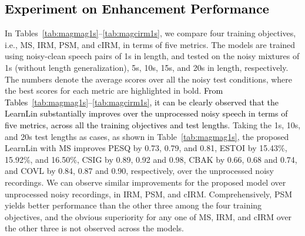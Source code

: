 \documentclass[journal]{IEEEtran}
\begin{document}
\subsection{\textcolor{black}{Experiment on Enhancement Performance}}\label{sec:5.2}


In Tables~\ref{tab:magmag1s}--\ref{tab:magcirm1s}, we compare four training objectives, i.e., MS, IRM, PSM, and cIRM, in terms of five metrics. The models are trained using noisy-clean speech pairs of 1s in length, and tested on the noisy mixtures of 1s (without length generalization), 5s, 10s, 15s, and 20s in length, respectively. The numbers denote the average scores over all the noisy test conditions, where the best scores for each metric are highlighted in bold. \textcolor{black}{From Tables~\ref{tab:magmag1s}--\ref{tab:magcirm1s}, it can be clearly observed that the LearnLin substantially improves over the unprocessed noisy speech in terms of five metrics, across all the training objectives and test lengths.} Taking the 1s, 10s, and 20s test lengths as cases, as shown in Table~\ref{tab:magmag1s}, the proposed LearnLin with MS improves PESQ by 0.73, 0.79, and 0.81, ESTOI by 15.43\%, 15.92\%, and 16.50\%, CSIG by 0.89, 0.92 and 0.98, CBAK by 0.66, 0.68 and 0.74, and COVL by 0.84, 0.87 and 0.90, respectively, over the unprocessed noisy recordings. We can observe similar improvements for the proposed model over unprocessed noisy recordings, in IRM, PSM, and cIRM. Comprehensively, PSM yields better performance than the other three among the four training objectives, and the obvious superiority for any one of MS, IRM, and cIRM over the other three is not observed across the models.
\end{document}
